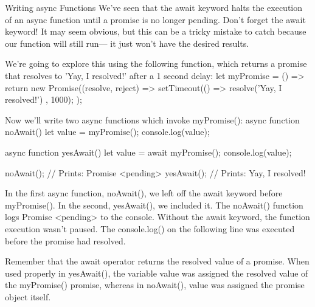 Writing async Functions
    We’ve seen that the await keyword halts the execution of an async function until a promise is no longer pending. Don’t forget the await keyword! It may seem obvious, but this can be a tricky mistake to catch because our function will still run— it just won’t have the desired results.

    We’re going to explore this using the following function, which returns a promise that resolves to 'Yay, I resolved!' after a 1 second delay:
        let myPromise = () => {
        return new Promise((resolve, reject) => {
            setTimeout(() => {
            resolve('Yay, I resolved!')
            }, 1000);
        });
        }
    
    Now we’ll write two async functions which invoke myPromise():
        async function noAwait() {
        let value = myPromise();
        console.log(value);
        }

        async function yesAwait() {
        let value = await myPromise();
        console.log(value);
        }

        noAwait(); // Prints: Promise { <pending> }
        yesAwait(); // Prints: Yay, I resolved!

    In the first async function, noAwait(), we left off the await keyword before myPromise(). In the second, yesAwait(), we included it. The noAwait() function logs Promise { <pending> } to the console. Without the await keyword, the function execution wasn’t paused. The console.log() on the following line was executed before the promise had resolved.

    Remember that the await operator returns the resolved value of a promise. When used properly in yesAwait(), the variable value was assigned the resolved value of the myPromise() promise, whereas in noAwait(), value was assigned the promise object itself.